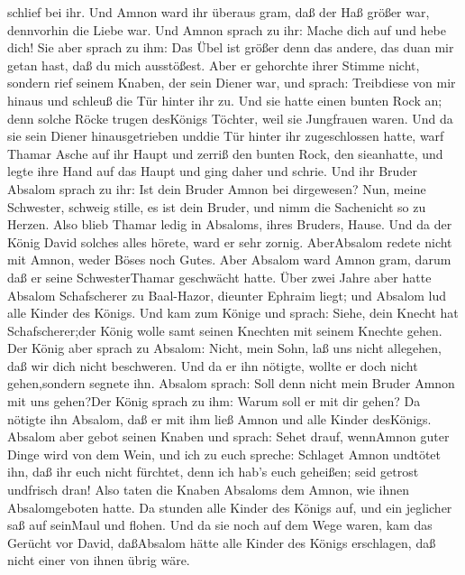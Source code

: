 schlief bei ihr.  Und Amnon ward ihr überaus gram, daß der
Haß größer war, dennvorhin die Liebe war. Und Amnon sprach zu ihr: Mache
dich auf und hebe dich!  Sie aber sprach zu ihm: Das Übel
ist größer denn das andere, das duan mir getan hast, daß du mich
ausstößest. Aber er gehorchte ihrer Stimme nicht,  sondern
rief seinem Knaben, der sein Diener war, und sprach: Treibdiese von mir
hinaus und schleuß die Tür hinter ihr zu.  Und sie hatte
einen bunten Rock an; denn solche Röcke trugen desKönigs Töchter, weil
sie Jungfrauen waren. Und da sie sein Diener hinausgetrieben unddie Tür
hinter ihr zugeschlossen hatte,  warf Thamar Asche auf ihr
Haupt und zerriß den bunten Rock, den sieanhatte, und legte ihre Hand
auf das Haupt und ging daher und schrie.  Und ihr Bruder
Absalom sprach zu ihr: Ist dein Bruder Amnon bei dirgewesen? Nun, meine
Schwester, schweig stille, es ist dein Bruder, und nimm die Sachenicht
so zu Herzen. Also blieb Thamar ledig in Absaloms, ihres Bruders, Hause.
 Und da der König David solches alles hörete, ward er sehr
zornig. AberAbsalom redete nicht mit Amnon, weder Böses noch Gutes.
 Aber Absalom ward Amnon gram, darum daß er seine
SchwesterThamar geschwächt hatte.  Über zwei Jahre aber
hatte Absalom Schafscherer zu Baal-Hazor, dieunter Ephraim liegt; und
Absalom lud alle Kinder des Königs.  Und kam zum Könige und
sprach: Siehe, dein Knecht hat Schafscherer;der König wolle samt seinen
Knechten mit seinem Knechte gehen.  Der König aber sprach
zu Absalom: Nicht, mein Sohn, laß uns nicht allegehen, daß wir dich
nicht beschweren. Und da er ihn nötigte, wollte er doch nicht
gehen,sondern segnete ihn.  Absalom sprach: Soll denn nicht
mein Bruder Amnon mit uns gehen?Der König sprach zu ihm: Warum soll er
mit dir gehen?  Da nötigte ihn Absalom, daß er mit ihm ließ
Amnon und alle Kinder desKönigs.  Absalom aber gebot seinen
Knaben und sprach: Sehet drauf, wennAmnon guter Dinge wird von dem Wein,
und ich zu euch spreche: Schlaget Amnon undtötet ihn, daß ihr euch nicht
fürchtet, denn ich hab's euch geheißen; seid getrost undfrisch dran!
 Also taten die Knaben Absaloms dem Amnon, wie ihnen
Absalomgeboten hatte. Da stunden alle Kinder des Königs auf, und ein
jeglicher saß auf seinMaul und flohen.  Und da sie noch auf
dem Wege waren, kam das Gerücht vor David, daßAbsalom hätte alle Kinder
des Königs erschlagen, daß nicht einer von ihnen übrig wäre.
